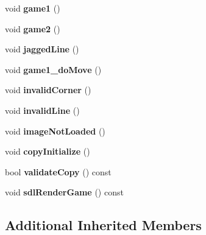 \begin{DoxyCompactItemize}
\item 
\hypertarget{classTests_a4ddcbb89a01d7e5317a03704cd077df2}{void {\bfseries game1} ()}\label{classTests_a4ddcbb89a01d7e5317a03704cd077df2}

\item 
\hypertarget{classTests_adcb4104bf3e71a817c65443a0e095cc7}{void {\bfseries game2} ()}\label{classTests_adcb4104bf3e71a817c65443a0e095cc7}

\item 
\hypertarget{classTests_a03c52a5d68e9aaf3d032e624041160c8}{void {\bfseries jagged\+Line} ()}\label{classTests_a03c52a5d68e9aaf3d032e624041160c8}

\item 
\hypertarget{classTests_a22394551fa9d1cc0707cc7b942a3714b}{void {\bfseries game1\+\_\+do\+Move} ()}\label{classTests_a22394551fa9d1cc0707cc7b942a3714b}

\item 
\hypertarget{classTests_a6b437e7b6b8c3d5f9865749eea129322}{void {\bfseries invalid\+Corner} ()}\label{classTests_a6b437e7b6b8c3d5f9865749eea129322}

\item 
\hypertarget{classTests_a624037459dcd5be353f290388337546a}{void {\bfseries invalid\+Line} ()}\label{classTests_a624037459dcd5be353f290388337546a}

\item 
\hypertarget{classTests_ada9fec53e6ed86ab994318ad5f91b94e}{void {\bfseries image\+Not\+Loaded} ()}\label{classTests_ada9fec53e6ed86ab994318ad5f91b94e}

\item 
\hypertarget{classTests_a280dd55f9ea89dc1aefff4a37c9ce418}{void {\bfseries copy\+Initialize} ()}\label{classTests_a280dd55f9ea89dc1aefff4a37c9ce418}

\item 
\hypertarget{classTests_aba00d7d16cba53fab489f9788e2bcc1f}{bool {\bfseries validate\+Copy} () const }\label{classTests_aba00d7d16cba53fab489f9788e2bcc1f}

\item 
\hypertarget{classTests_a0bbd4987e015b1f042a2e0f1eeb12d88}{void {\bfseries sdl\+Render\+Game} () const }\label{classTests_a0bbd4987e015b1f042a2e0f1eeb12d88}

\end{DoxyCompactItemize}
\subsection*{Additional Inherited Members}


